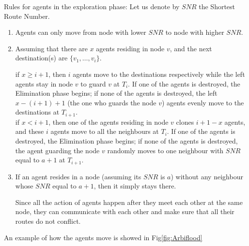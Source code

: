 Rules for agents in the exploration phase:
Let us denote by $SNR$ the Shortest Route Number.
\begin{enumerate}
\item Agents can only move from node with lower $SNR$ to node with higher $SNR$.
\item Assuming that there are $x$ agents residing in node $v$, and the next destination(s) are $\{v_1,\ldots, v_i\}$. 

        if $x\geq i+1$, then $i$ agents move to the destinations respectively while the left agents stay in node $v$ to guard $v$ at $T_i$. If one of the agents is destroyed, the Elimination phase begins; if none of the agents is destroyed, the left $x-(i+1)+1$ (the one who guards the node $v$) agents evenly move to the destinations at $T_{i+1}$. \\
        if $x< i+1$, then one of the agents residing in node $v$ clones $i+1-x$ agents, and these $i$ agents move to all the neighbours at $T_i$. If one of the agents is destroyed, the Elimination phase begins; if none of the agents is destroyed, the agent guarding the node $v$ randomly moves to one neighbour with $SNR$ equal to $a+1$ at $T_{i+1}$.
\item If an agent resides in a node (assuming its $SNR$ is $a$) without any neighbour whose $SNR$ equal to $a+1$, then it simply stays there.
 
        Since all the action of agents happen after they meet each other at the same node, they can communicate with each other and make sure that all their routes do not conflict.
\end{enumerate}
An example of how the agents move is showed in Fig\ref{fig:Arbiflood}
